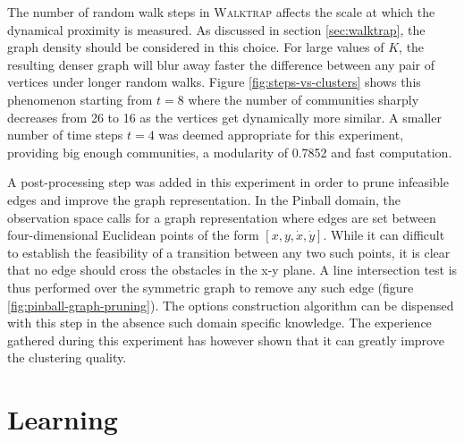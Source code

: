 \documentclass[12pt, oneside, extrafontsizes]{memoir}  %
\theoremstyle{plain}
\theoremstyle{definition}
\begin{document}
The number of random walk steps in \textsc{Walktrap} affects the scale at which the dynamical proximity is measured. As discussed in section \ref{sec:walktrap}, the graph density should be considered in this choice. For large values of $K$, the resulting denser graph will blur away faster the difference between any pair of vertices under longer random walks. Figure \ref{fig:steps-vs-clusters} shows this phenomenon starting from $t=8$ where the number of communities sharply decreases from 26 to 16 as the vertices get dynamically more similar. A smaller number of time steps $t=4$ was deemed appropriate for this experiment, providing big enough communities, a modularity of 0.7852 and fast computation.

A post-processing step was added in this experiment in order to prune infeasible edges and improve the graph representation. In the Pinball domain, the observation space calls for a graph representation where edges are set between four-dimensional Euclidean points of the form $[x, y, \dot{x}, \dot{y}]$. While it can difficult to establish the feasibility of a transition between any two such points, it is clear that no edge should cross the obstacles in the x-y plane. A line intersection test is thus performed over the symmetric graph to remove any such edge (figure \ref{fig:pinball-graph-pruning}). The options construction algorithm can be dispensed with this step in the absence such domain specific knowledge. The experience gathered during this experiment has however shown that it can greatly improve the clustering quality.

\section{Learning}
\end{document}

